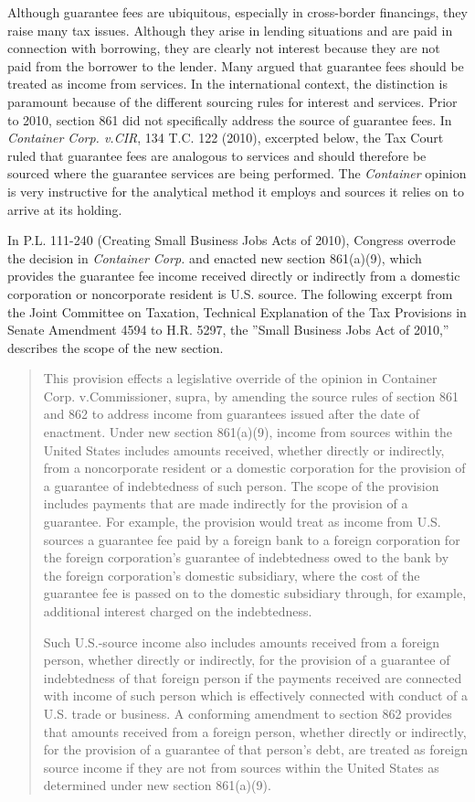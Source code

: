Although guarantee fees are ubiquitous, especially in cross-border financings, they raise many tax issues.  Although they arise in lending situations and are paid in connection with borrowing, they are clearly not interest because they are not paid from the borrower to the lender.  Many argued that guarantee fees should be treated as income from services.  In the international context, the distinction is paramount because of the different sourcing rules for interest and services.  Prior to 2010, section 861 did not specifically address the source of guarantee fees.  In \emph{Container Corp. v.\@ CIR}, 134 T.C. 122 (2010), excerpted below, the Tax Court ruled that guarantee fees are analogous to services and should therefore be sourced where the guarantee services are being performed.  The \emph{Container} opinion is very instructive for the analytical method it employs and sources it relies on to arrive at its holding.   


In P.L. 111-240 (Creating Small Business Jobs Acts of 2010), Congress overrode the decision in \emph{Container Corp.} and enacted new section 861(a)(9), which provides the guarantee fee income received directly or indirectly from a domestic corporation or noncorporate resident is U.S. source.  The following excerpt from the Joint Committee on Taxation, Technical Explanation of the Tax Provisions in Senate Amendment 4594 to H.R. 5297, the ''Small Business Jobs Act of 2010,'' describes the scope of the new section.
	\begin{quote}
This provision effects a legislative override of the opinion in Container Corp. v.\@ Commissioner, supra, by 
amending the source rules of section 861 and 862 to address income from guarantees issued after the date 
of enactment. Under new section 861(a)(9), income from sources within the United States includes amounts 
received, whether directly or indirectly, from a noncorporate resident or a domestic corporation for the 
provision of a guarantee of indebtedness of such person. The scope of the provision includes payments that 
are made indirectly for the provision of a guarantee. For example, the provision would treat as income from 
U.S. sources a guarantee fee paid by a foreign bank to a foreign corporation for the foreign corporation's 
guarantee of indebtedness owed to the bank by the foreign corporation's domestic subsidiary, where the 
cost of the guarantee fee is passed on to the domestic subsidiary through, for example, additional interest 
charged on the indebtedness. 

Such U.S.-source income also includes amounts received from a foreign person, whether directly or 
indirectly, for the provision of a guarantee of indebtedness of that foreign person if the payments received 
are connected with income of such person which is effectively connected with conduct of a U.S. trade or 
business. A conforming amendment to section 862 provides that amounts received from a foreign person, 
whether directly or indirectly, for the provision of a guarantee of that person's debt, are treated as foreign 
source income if they are not from sources within the United States as determined under new section 861(a)(9). 

	\end{quote}


